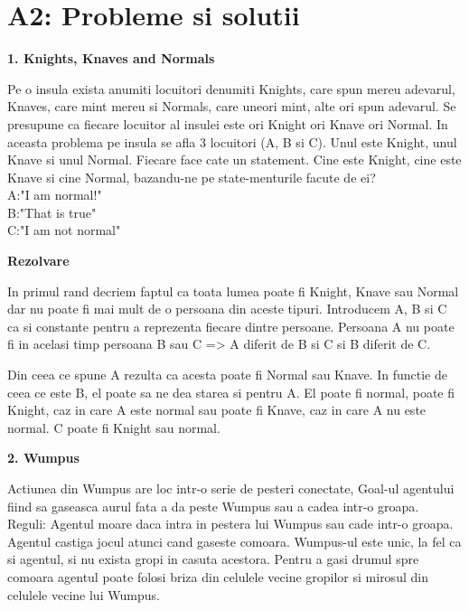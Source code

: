 \documentclass[a4paper,12pt]{report}
\begin{document}
\chapter{A2: Probleme si solutii}
\begin{Large}
 \textbf{       1. Knights, Knaves and Normals}\\
\end{Large}
Pe o insula exista anumiti locuitori denumiti Knights, care spun mereu adevarul, Knaves, care mint mereu si Normals, care uneori mint, alte ori spun adevarul. Se presupune ca fiecare locuitor al insulei este ori Knight ori Knave ori Normal. In aceasta problema pe insula se afla 3 locuitori (A, B si C). Unul este Knight, unul Knave si unul Normal. Fiecare face cate un statement. Cine este Knight, cine este Knave si cine Normal, bazandu-ne pe state-menturile facute de ei?\\

A:"I am normal!"\\
B:"That is true"\\
C:"I am not normal"\\

\begin{Large}
 \textbf{Rezolvare}\\
\end{Large}
In primul rand decriem faptul ca toata lumea poate fi Knight, Knave sau Normal dar nu poate fi mai mult de o persoana din aceste tipuri.
Introducem A, B si C ca si constante pentru a reprezenta fiecare dintre persoane. Persoana A nu poate fi in acelasi timp persoana B sau C => A diferit de B si C si B diferit de C.

Din ceea ce spune A rezulta ca acesta poate fi Normal sau Knave.
In functie de ceea ce este B, el poate sa ne dea starea si pentru A. El poate fi normal, poate fi Knight, caz in care A este normal sau poate fi Knave, caz in care A nu este normal.
C poate fi Knight sau normal.\\


\begin{Large}
 \textbf{2. Wumpus}\\
\end{Large}
Actiunea din Wumpus are loc intr-o serie de pesteri conectate, Goal-ul agentului fiind sa gaseasca aurul fata a da peste Wumpus sau a cadea intr-o groapa.\\
Reguli: Agentul moare daca intra in pestera lui Wumpus sau cade intr-o groapa. Agentul castiga jocul atunci cand gaseste comoara. Wumpus-ul este unic, la fel ca si agentul, si nu exista gropi in casuta acestora. Pentru a gasi drumul spre comoara agentul poate folosi briza din celulele vecine gropilor si mirosul din celulele vecine lui Wumpus.
\end{document}
